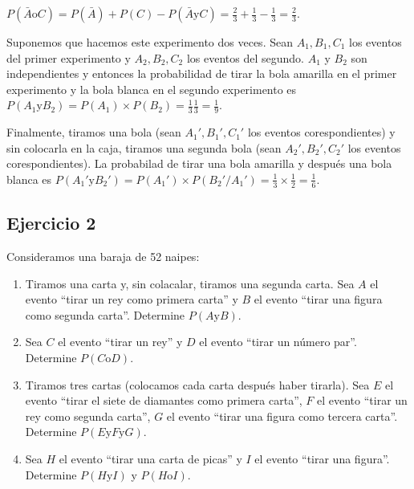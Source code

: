 $
P(\bar{A} \text{o} C) = P(\bar{A}) + P(C) - P(\bar{A} \text{y} C)
= \frac{2}{3} + \frac{1}{3} - \frac{1}{3} = \frac{2}{3}
$.

Suponemos que hacemos este experimento dos veces.
Sean $A_1, B_1, C_1$ los eventos del primer experimento y
$A_2, B_2, C_2$ los eventos del segundo. $A_1$ y $B_2$ son independientes y
entonces la probabilidad de tirar la bola amarilla en el primer experimento
y la bola blanca en el segundo experimento es
$P(A_1 \text{y} B_2) = {P(A_1)} \times {P(B_2)} = \frac{1}{3} \frac{1}{3} =
\frac{1}{9}$.

Finalmente, tiramos una bola (sean $A_1', B_1', C_1'$ los eventos
corespondientes) y sin colocarla en la caja, tiramos una segunda bola
(sean $A_2', B_2', C_2'$ los eventos corespondientes). La probabilad de
tirar una bola amarilla y después una bola blanca es
${P(A_1' \text{y} B_2')} = P(A_1') \times {P(B_2' / A_1')} =
\frac{1}{3} \times \frac{1}{2} = \frac{1}{6}$.

\subsection{Ejercicio 2}

Consideramos una baraja de 52 naipes:

\begin{enumerate}

\item Tiramos una carta y, sin colacalar, tiramos una segunda carta.
  Sea $A$ el evento ``tirar un rey como primera carta'' y $B$ el evento
  ``tirar una figura como segunda carta''. Determine $P(A \text{y} B)$.

\item Sea $C$ el evento ``tirar un rey'' y $D$ el evento
  ``tirar un número par''. Determine $P(C \text{o} D)$.

\item Tiramos tres cartas (colocamos cada carta después haber tirarla).
  Sea $E$ el evento ``tirar el siete de diamantes como primera carta'',
  $F$ el evento ``tirar un rey como segunda carta'',
  $G$ el evento ``tirar una figura como tercera carta''. Determine
  $P(E \text{y} F \text{y} G)$.

\item Sea $H$ el evento ``tirar una carta de picas'' y $I$ el evento
  ``tirar una figura''. Determine $P(H \text{y} I)$ y $P(H \text{o} I)$.

\end{enumerate}


